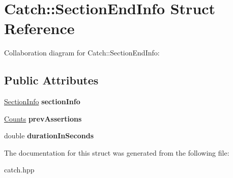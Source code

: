 \hypertarget{structCatch_1_1SectionEndInfo}{}\section{Catch\+:\+:Section\+End\+Info Struct Reference}
\label{structCatch_1_1SectionEndInfo}


Collaboration diagram for Catch\+:\+:Section\+End\+Info\+:
\subsection*{Public Attributes}
\begin{DoxyCompactItemize}
\item 
\mbox{\label{structCatch_1_1SectionEndInfo_a2d44793392cb83735d086d726822abe9}} 
\hyperlink{structCatch_1_1SectionInfo}{Section\+Info} {\bfseries section\+Info}
\item 
\mbox{\label{structCatch_1_1SectionEndInfo_ae70b154cbc05b5dd2901d97f89303d8c}} 
\hyperlink{structCatch_1_1Counts}{Counts} {\bfseries prev\+Assertions}
\item 
\mbox{\label{structCatch_1_1SectionEndInfo_a7c262f2dab9cff166b8eca620c47eea5}} 
double {\bfseries duration\+In\+Seconds}
\end{DoxyCompactItemize}


The documentation for this struct was generated from the following file\+:\begin{DoxyCompactItemize}
\item 
catch.\+hpp\end{DoxyCompactItemize}
